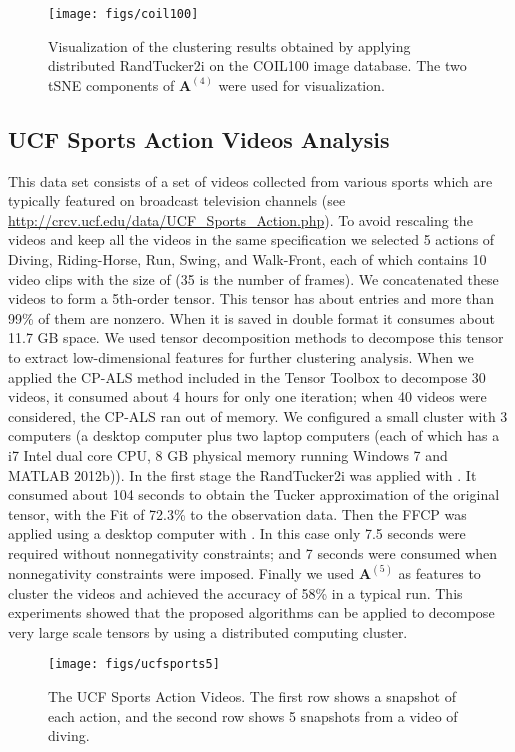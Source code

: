 \documentclass[10pt,twocolumn,twoside]{IEEEtran}
\newcommand{\matn}[2][n]{\ensuremath{\mathbf{#2}^{(#1)}}}
\begin{document}
 \begin{figure}[!t]
\centerline{
    \texttt{[image: figs/coil100]}
}
\caption{Visualization of the clustering results obtained by applying distributed RandTucker2i on the COIL100 image database. The two tSNE components of \matn[4]{A} were used for visualization.}
\label{fig:COIL100clusters}
\end{figure}

\subsection{UCF Sports Action Videos Analysis}
This data set consists of a set of videos collected from various sports which are typically featured on broadcast television channels \cite{UCFSports} (see \url{http://crcv.ucf.edu/data/UCF_Sports_Action.php}). To avoid rescaling the videos and keep all the videos in the same specification we selected 5 actions of Diving, Riding-Horse, Run, Swing, and Walk-Front, each of which contains 10 video clips with the size of  (35 is the number of frames). We concatenated these videos to form a 5th-order tensor. This tensor has about  entries and more than 99\% of them are nonzero. When it is saved in double format it consumes about 11.7 GB space. We used tensor decomposition methods to decompose this tensor to extract low-dimensional features for further clustering analysis. When we applied the CP-ALS method included in the Tensor Toolbox to decompose 30 videos, it consumed about 4 hours for only one iteration; when 40 videos were considered, the CP-ALS ran out of memory. We configured a small cluster with 3 computers (a desktop computer plus two laptop computers (each of which has a i7 Intel dual core CPU, 8 GB physical memory running Windows 7 and MATLAB 2012b)). In the first stage the RandTucker2i was applied with . It consumed about 104 seconds to obtain the Tucker approximation of the original tensor, with the Fit of 72.3\% to the observation data. Then the FFCP was applied using a desktop computer with . In this case only 7.5 seconds were required without nonnegativity constraints; and 7 seconds were consumed when nonnegativity constraints were imposed. Finally we used \matn[5]{A} as features to cluster the videos and achieved the accuracy of 58\% in a typical run. This experiments showed that the proposed algorithms can be applied to decompose very large scale tensors by using a distributed computing cluster.

 \begin{figure}[!t]
\centerline{
    \texttt{[image: figs/ucfsports5]}
}
\caption{The UCF Sports Action Videos. The first row shows a snapshot of each action, and the second row shows 5 snapshots from a video of diving.}
\label{fig:UCFSports}
\end{figure}
\end{document}

